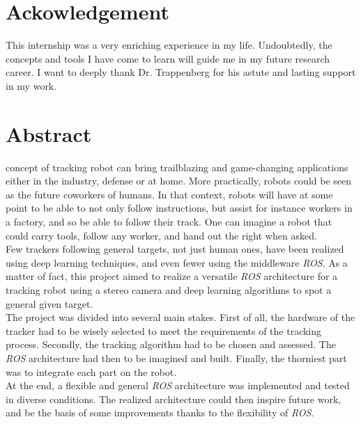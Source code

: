 
\vspace{50pt}

\section*{Ackowledgement}\label{thk}

This internship was a very enriching experience in my life.
Undoubtedly, the concepts and tools I have come to learn will 
guide me in my future research career. I want to deeply thank
Dr. Trappenberg for his astute and lasting support
in my work.


\clearpage

\section*{Abstract}

 concept of tracking robot can bring trailblazing and 
game-changing applications either in the industry, defense or
at home. More practically, robots could be seen as
the future coworkers of humans. In that context, 
robots will have at some point to be able to 
not only follow instructions, but assist for instance
workers in a factory, and so be able to 
follow their track. One can imagine a robot that could 
carry tools, follow any worker, and hand out the right 
when asked.
\\\indent Few trackers following general targets, not just 
human ones, have been realized using deep learning
techniques, and even fewer using the middleware
\textit{ROS}. As a matter of fact, this project aimed to 
realize a versatile \textit{ROS} architecture
for a tracking robot using a stereo camera
and deep learning algorithms to spot a 
general given target.
\\\indent The project was divided into 
several main stakes. First of all, the hardware
of the tracker had to be wisely selected to 
meet the requirements of the tracking process. 
Secondly, the tracking algorithm had to be chosen 
and assessed. The \textit{ROS} architecture had 
then to be imagined and built. Finally, the thorniest 
part was to integrate each part on the robot.
\\\indent At the end, a flexible and general \textit{ROS}
architecture was implemented and tested in diverse 
conditions. The realized architecture 
could then inspire future work, and be the basis 
of some improvements thanks to the flexibility of \textit{ROS}.


\clearpage
